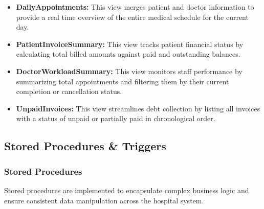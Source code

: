 \begin{itemize}
    \item \textbf{DailyAppointments:} This view merges patient and doctor information to provide a real time overview of the entire medical schedule for the current day.
    \item \textbf{PatientInvoiceSummary:} This view tracks patient financial status by calculating total billed amounts against paid and outstanding balances.
    \item \textbf{DoctorWorkloadSummary:} This view monitors staff performance by summarizing total appointments and filtering them by their current completion or cancellation status.
    \item \textbf{UnpaidInvoices:} This view streamlines debt collection by listing all invoices with a status of unpaid or partially paid in chronological order.
\end{itemize}

\subsection{Stored Procedures \& Triggers}

\subsubsection*{Stored Procedures}
Stored procedures are implemented to encapsulate complex business logic and ensure consistent data manipulation across the hospital system.

